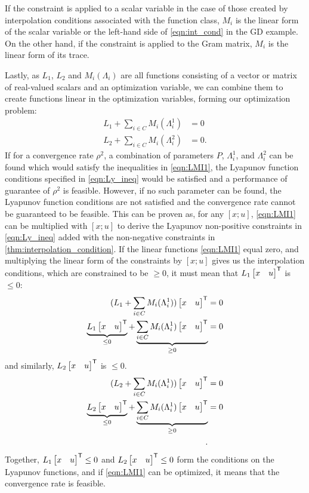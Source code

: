 If the constraint is applied to a scalar variable in the case of those created by interpolation conditions associated with the function class, $M_i$ is the linear form of the scalar variable or the left-hand side of \eqref{eqn:int_cond} in the GD example. On the other hand, if the constraint is applied to the Gram matrix, $M_i$ is the linear form of its trace. 

Lastly, as $L_1$, $L_2$ and $M_i(\Lambda_i)$ are all functions consisting of a vector or matrix of real-valued scalars and an optimization variable, we can combine them to create functions linear in the optimization variables, forming our optimization problem:
\begin{subequations} \label{eqn:LMI1}
	\begin{align} 
		L_1 + \sum_{i\in C} M_i(\Lambda_i^1) &= 0  \\
		L_2 + \sum_{i\in C} M_i(\Lambda_i^2) &= 0.
	\end{align}
\end{subequations}
If for a convergence rate $\rho^2$, a combination of parameters $P$, $\Lambda_i^1$, and $\Lambda_i^2$ can be found which would satisfy the inequalities in \eqref{eqn:LMI1}, the Lyapunov function conditions specified in \eqref{eqn:Ly_ineq} would be satisfied and a performance of guarantee of $\rho^2$ is feasible. However, if no such parameter can be found, the Lyapunov function conditions are not satisfied and the convergence rate cannot be guaranteed to be feasible. This can be proven as, for any $[x; u]$, \eqref{eqn:LMI1} can be multiplied with $[x; u]$ to derive the Lyapunov non-positive constraints in \eqref{eqn:Ly_ineq} added with the non-negative constraints in \cref{thm:interpolation_condition}. If the linear functions \eqref{eqn:LMI1} equal zero, and multiplying the linear form of the constraints by $[x; u]$ gives us the interpolation conditions, which are constrained to be $\geq 0$, it must mean that $L_1\begin{bmatrix}x & u\end{bmatrix}^{\mathsf{T}}$ is $\leq 0$:
\begin{subequations} \label{eqn:LMI2}
	\begin{align} 
		(L_1 + \sum_{i\in C} M_i(\Lambda_i^1))\begin{bmatrix}x & u\end{bmatrix}^{\mathsf{T}} &= 0  \\
		\underbrace{L_1\begin{bmatrix}x & u\end{bmatrix}^{\mathsf{T}}}_{\leq 0} + \underbrace{\sum_{i\in C} M_i(\Lambda_i^1)\begin{bmatrix}x & u\end{bmatrix}^{\mathsf{T}}}_{\geq 0} &= 0  \\
	\end{align}
\end{subequations}
and similarly, $L_2\begin{bmatrix}x & u\end{bmatrix}^{\mathsf{T}}$ is $\leq 0$.
\begin{subequations} \label{eqn:LMI3}
	\begin{align*} 
		(L_2 + \sum_{i\in C} M_i(\Lambda_i^1))\begin{bmatrix}x & u\end{bmatrix}^{\mathsf{T}} &= 0  \\
		\underbrace{L_2\begin{bmatrix}x & u\end{bmatrix}^{\mathsf{T}}}_{\leq 0} + \underbrace{\sum_{i\in C} M_i(\Lambda_i^1)\begin{bmatrix}x & u\end{bmatrix}^{\mathsf{T}}}_{\geq 0} &= 0  \\.
	\end{align*}
\end{subequations}
Together, $L_1\begin{bmatrix}x & u\end{bmatrix}^{\mathsf{T}} \leq 0$ and $L_2\begin{bmatrix}x & u\end{bmatrix}^{\mathsf{T}} \leq 0$ form the conditions on the Lyapunov functions, and if \eqref{eqn:LMI1} can be optimized, it means that the convergence rate is feasible.

